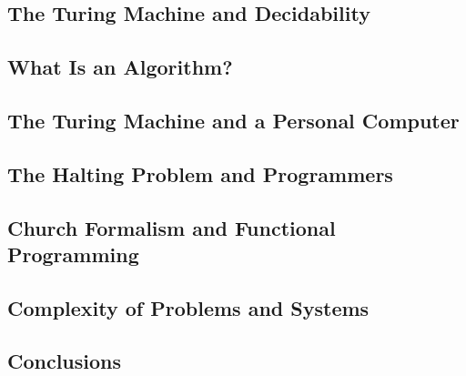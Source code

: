 \documentclass[a4paper]{article}
\begin{document}
\subsection{The Turing Machine and Decidability}
\subsection{What Is an Algorithm?}
\subsection{The Turing Machine and a Personal Computer}
\subsection{The Halting Problem and Programmers}
\subsection{Church Formalism and Functional Programming}
\subsection{Complexity of Problems and Systems}
\subsection{Conclusions}
\end{document}
